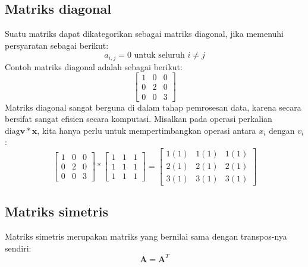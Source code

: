 \subsection{Matriks diagonal}
Suatu matriks dapat dikategorikan sebagai matriks diagonal, jika memenuhi persyaratan sebagai berikut:
\begin{equation*}
    a_{i,j} = 0\text{ untuk seluruh } i \neq j
\end{equation*}
Contoh matriks diagonal adalah sebagai berikut:
\begin{equation*}
    \begin{bmatrix}1 & 0 & 0\\0 & 2 & 0\\0 & 0 & 3\end{bmatrix}
\end{equation*}
Matriks diagonal sangat berguna di dalam tahap pemrosesan data, karena secara bersifat sangat efisien secara komputasi. Misalkan pada operasi perkalian $\text{diag}\mathbf{v}*\mathbf{x}$, kita hanya perlu untuk mempertimbangkan operasi antara $x_{i}$ dengan $v_{i}$:
\begin{dmath*}
   \begin{bmatrix}1 & 0 & 0\\0 & 2 & 0\\0 & 0 & 3\end{bmatrix} * \begin{bmatrix}1 & 1 & 1\\ 1 & 1 & 1\\ 1 & 1 & 1\end{bmatrix} = \begin{bmatrix}1(1) & 1(1) & 1(1)\\ 2(1) & 2(1) & 2(1)\\ 3(1) & 3(1) & 3(1)\end{bmatrix}
\end{dmath*}
\subsection{Matriks simetris}
Matriks simetris merupakan matriks yang bernilai sama dengan transpos-nya sendiri:
\begin{equation}\label{eqn:eqn13}
    \mathbf{A} = \mathbf{A}^T
\end{equation}
